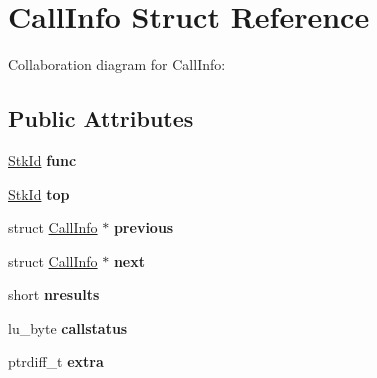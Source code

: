 \hypertarget{struct_call_info}{\section{Call\+Info Struct Reference}
\label{struct_call_info}
}


Collaboration diagram for Call\+Info\+:
\subsection*{Public Attributes}
\begin{DoxyCompactItemize}
\item 
\hypertarget{struct_call_info_a378cfb37136fabfe59d1c38071c6c9d1}{\hyperlink{structlua___t_value}{Stk\+Id} {\bfseries func}}\label{struct_call_info_a378cfb37136fabfe59d1c38071c6c9d1}

\item 
\hypertarget{struct_call_info_ae782b06ef00ccfe0720625ffa99b093a}{\hyperlink{structlua___t_value}{Stk\+Id} {\bfseries top}}\label{struct_call_info_ae782b06ef00ccfe0720625ffa99b093a}

\item 
\hypertarget{struct_call_info_a1b3e7558ecf4218dd0e3b367c077733b}{struct \hyperlink{struct_call_info}{Call\+Info} $\ast$ {\bfseries previous}}\label{struct_call_info_a1b3e7558ecf4218dd0e3b367c077733b}

\item 
\hypertarget{struct_call_info_a71b69e9acba8caa2d8e833d8a79fdf9d}{struct \hyperlink{struct_call_info}{Call\+Info} $\ast$ {\bfseries next}}\label{struct_call_info_a71b69e9acba8caa2d8e833d8a79fdf9d}

\item 
\hypertarget{struct_call_info_a0955b3fe49462610d53f082ac3cdac0e}{short {\bfseries nresults}}\label{struct_call_info_a0955b3fe49462610d53f082ac3cdac0e}

\item 
\hypertarget{struct_call_info_af0b3a7a44d49819655c7864faa259198}{lu\+\_\+byte {\bfseries callstatus}}\label{struct_call_info_af0b3a7a44d49819655c7864faa259198}

\item 
\hypertarget{struct_call_info_a6ebaf591a47102099de117ef0e29d0b9}{ptrdiff\+\_\+t {\bfseries extra}}\label{struct_call_info_a6ebaf591a47102099de117ef0e29d0b9}


\end{DoxyCompactItemize}

